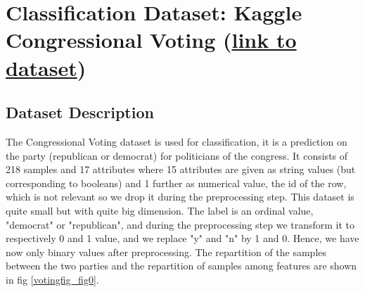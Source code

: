 \documentclass[11pt]{article}
\begin{document}
\section{Classification Dataset: Kaggle Congressional Voting (\href{https://www.kaggle.com/c/184702-tu-ml-ss-21-congressional-voting/overview}{link to dataset})}

\subsection{Dataset Description}
The Congressional Voting dataset is used for classification, it is a prediction on the party (republican or democrat) for politicians of the congress. It consists of 218 samples and 17 attributes where 15 attributes are given as string values (but corresponding to booleans) and 1 further as numerical value, the id of the row, which is not relevant so we drop it during the preprocessing step. This dataset is quite small but with quite big dimension. 
The label is an ordinal value, "democrat" or "republican", and during the preprocessing step we transform it to respectively 0 and 1 value, and we replace "y" and "n" by 1 and 0. Hence, we have now only binary values after preprocessing. The repartition of the samples between the two parties and the repartition of samples among features are shown in fig  \ref{votingfig_fig0}.
\end{document}

